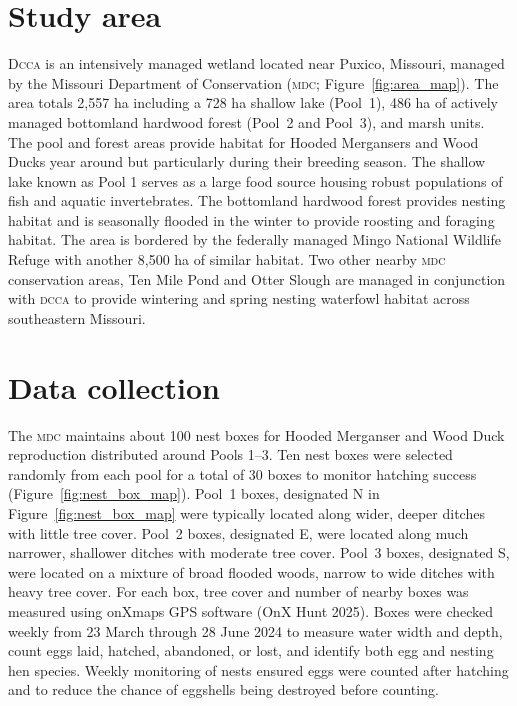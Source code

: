 
\section*{Study area}

D\textsc{cca} is an intensively managed wetland located near Puxico, Missouri, managed by the Missouri Department of Conservation (\textsc{mdc}; Figure~\ref{fig:area_map}). The area totals 2,557 ha including a 728 ha shallow lake (Pool~1), 486 ha of actively managed bottomland hardwood forest (Pool~2 and Pool~3), and marsh units. The pool and forest areas provide habitat for Hooded Mergansers and Wood Ducks year around but particularly during their breeding season. The shallow lake known as Pool 1 serves as a large food source housing robust populations of fish and aquatic invertebrates. The bottomland hardwood forest provides nesting habitat and is seasonally flooded in the winter to provide roosting and foraging habitat. The area is bordered by the federally managed Mingo National Wildlife Refuge with another 8,500 ha of similar habitat.  Two other nearby \textsc{mdc} conservation areas, Ten Mile Pond and Otter Slough are managed in conjunction with \textsc{dcca} to provide wintering and spring nesting waterfowl habitat across southeastern Missouri. 

 


\section*{Data collection}

The \textsc{mdc} maintains about 100 nest boxes for Hooded Merganser and Wood Duck reproduction distributed around Pools 1–3.  Ten nest boxes were selected randomly from each pool for a total of 30 boxes to monitor hatching success (Figure~\ref{fig:nest_box_map}).  Pool~1 boxes, designated N in Figure~\ref{fig:nest_box_map} were typically located along wider, deeper ditches with little tree cover. Pool~2 boxes, designated E, were located along much narrower, shallower ditches with moderate tree cover. Pool~3 boxes, designated S, were located on a mixture of broad flooded woods, narrow to wide ditches with heavy tree cover. For each box, tree cover and number of nearby boxes was measured using onXmaps GPS software (OnX Hunt 2025). Boxes were checked weekly from 23 March through 28 June 2024 to measure water width and depth, count eggs laid, hatched, abandoned, or lost, and identify both egg and nesting hen species. Weekly monitoring of nests ensured eggs were counted after hatching and to reduce the chance of eggshells being destroyed before counting. 

